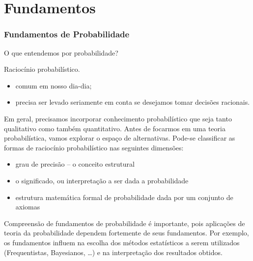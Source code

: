\section{Fundamentos}
\begin{frame}
\frametitle{Fundamentos de Probabilidade}
\begin{block}{O que entendemos por probabilidade?}
	
	Raciocínio probabilístico.
	\begin{itemize}
		\item comum em nosso dia-dia;
		\item precisa ser levado seriamente em conta
		se desejamos tomar decisões racionais.
	\end{itemize}
	
	Em geral, precisamos incorporar conhecimento
	probabilístico que seja tanto qualitativo como também quantitativo. Antes de focarmos em uma teoria
	probabilística, vamos explorar o espaço de alternativas. Pode-se
	classificar as formas de raciocínio probabilístico nas seguintes
	dimensões:
	
\end{block}

	\begin{itemize}
		\item grau de precisão -- o conceito estrutural
		\item o significado, ou interpretação a ser dada a probabilidade
		\item estrutura matemática formal de probabilidade dada por um
		conjunto de axiomas
	\end{itemize}
	
	Compreensão de fundamentos de probabilidade é importante, pois aplicações de teoria da probabilidade dependem fortemente de seus fundamentos. Por exemplo, os fundamentos influem na escolha dos métodos estatísticos a serem utilizados (Frequentistas, Bayesianos, \ldots) e na interpretação dos resultados obtidos.
	
\end{frame}

%
%
%


